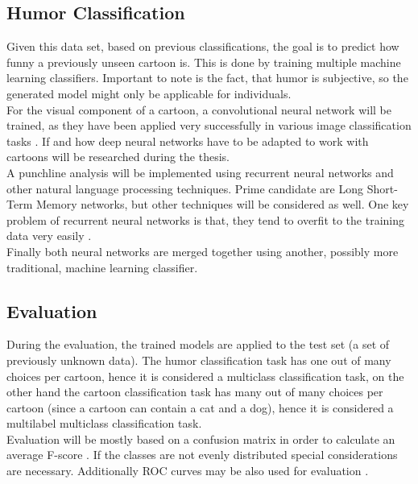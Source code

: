 \documentclass[draft,final]{vutinfth} %
\begin{document}
\subsection {Humor Classification}
Given this data set, based on previous classifications, the goal is to predict how funny a previously unseen cartoon is. This is done by training multiple machine learning classifiers. Important to note is the fact, that humor is subjective, so the generated model might only be applicable for individuals. \\

For the visual component of a cartoon, a convolutional neural network will be trained, as they have been applied very successfully in various image classification tasks \cite{dogsvscats}. If and how deep neural networks have to be adapted to work with cartoons will be researched during the thesis.\\

A punchline analysis will be implemented using recurrent neural networks and other natural language processing techniques. Prime candidate are Long Short-Term Memory networks, but other techniques will be considered as well. One key problem of recurrent neural networks is that, they tend to overfit to the training data very easily \cite[page 4]{reviewRNN}. \\

Finally both neural networks are merged together using another, possibly more traditional, machine learning classifier. \\
 
\subsection {Evaluation}

During the evaluation, the trained models are applied to the test set (a set of previously unknown data). The humor classification task has one out of many choices per cartoon, hence it is considered a multiclass classification task, on the other hand the cartoon classification task has many out of many choices per cartoon (since a cartoon can contain a cat and a dog), hence it is considered a multilabel multiclass classification task. \\

Evaluation will be mostly based on a confusion matrix in order to calculate an average F-score \cite{Powers2008EvaluationFP}. If the classes are not evenly distributed special considerations are necessary. Additionally ROC curves may be also used for evaluation \cite{Hand2001}. 
\end{document}
